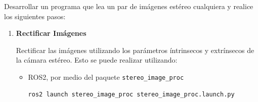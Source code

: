 \documentclass[tp]{lcc}
\begin{document}
\ejercicio Desarrollar un programa que lea un par de imágenes estéreo cualquiera y realice los siguientes pasos:

\begin{enumerate}
    
    
    \item \textbf{Rectificar Imágenes}
    
    Rectificar las imágenes utilizando los parámetros íntrinsecos y extrínsecos de la cámara estéreo. Esto se puede realizar utilizando:
    
    \begin{itemize}
        \item ROS2, por medio del paquete \lstinline{stereo_image_proc}
        
\begin{lstlisting}[style=bash]     
ros2 launch stereo_image_proc stereo_image_proc.launch.py
\end{lstlisting}
        

\end{itemize}
\end{enumerate}
\end{document}
